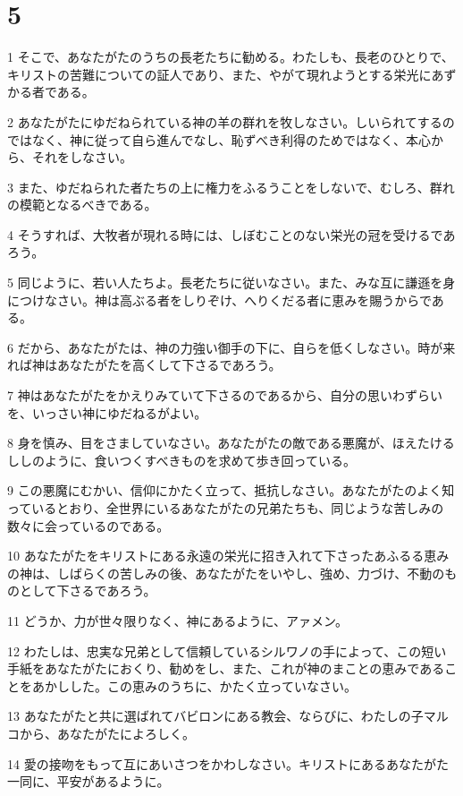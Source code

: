 \chapter{5}

\par 1 そこで、あなたがたのうちの長老たちに勧める。わたしも、長老のひとりで、キリストの苦難についての証人であり、また、やがて現れようとする栄光にあずかる者である。
\par 2 あなたがたにゆだねられている神の羊の群れを牧しなさい。しいられてするのではなく、神に従って自ら進んでなし、恥ずべき利得のためではなく、本心から、それをしなさい。
\par 3 また、ゆだねられた者たちの上に権力をふるうことをしないで、むしろ、群れの模範となるべきである。
\par 4 そうすれば、大牧者が現れる時には、しぼむことのない栄光の冠を受けるであろう。
\par 5 同じように、若い人たちよ。長老たちに従いなさい。また、みな互に謙遜を身につけなさい。神は高ぶる者をしりぞけ、へりくだる者に恵みを賜うからである。
\par 6 だから、あなたがたは、神の力強い御手の下に、自らを低くしなさい。時が来れば神はあなたがたを高くして下さるであろう。
\par 7 神はあなたがたをかえりみていて下さるのであるから、自分の思いわずらいを、いっさい神にゆだねるがよい。
\par 8 身を慎み、目をさましていなさい。あなたがたの敵である悪魔が、ほえたけるししのように、食いつくすべきものを求めて歩き回っている。
\par 9 この悪魔にむかい、信仰にかたく立って、抵抗しなさい。あなたがたのよく知っているとおり、全世界にいるあなたがたの兄弟たちも、同じような苦しみの数々に会っているのである。
\par 10 あなたがたをキリストにある永遠の栄光に招き入れて下さったあふるる恵みの神は、しばらくの苦しみの後、あなたがたをいやし、強め、力づけ、不動のものとして下さるであろう。
\par 11 どうか、力が世々限りなく、神にあるように、アァメン。
\par 12 わたしは、忠実な兄弟として信頼しているシルワノの手によって、この短い手紙をあなたがたにおくり、勧めをし、また、これが神のまことの恵みであることをあかしした。この恵みのうちに、かたく立っていなさい。
\par 13 あなたがたと共に選ばれてバビロンにある教会、ならびに、わたしの子マルコから、あなたがたによろしく。
\par 14 愛の接吻をもって互にあいさつをかわしなさい。キリストにあるあなたがた一同に、平安があるように。


